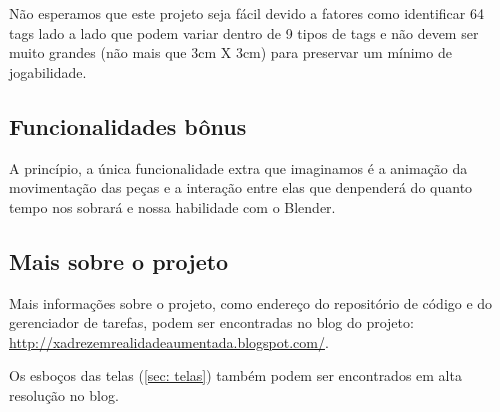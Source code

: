 \documentclass[a4paper,12pt]{article}
\begin{document}
N\~ao esperamos que este projeto seja f\'acil devido a fatores como identificar
64 tags lado a lado que podem variar dentro de 9 tipos de tags e n\~ao devem ser
muito grandes (n\~ao mais que 3cm X 3cm) para preservar um m\'inimo de
jogabilidade.

\subsection{Funcionalidades b\^onus}
\label{subsec: funcionalidaesbinus}

A princ\'ipio, a \'unica funcionalidade extra que imaginamos \'e a anima\c c\~ao
da movimenta\c c\~ao das pe\c cas e a intera\c c\~ao entre elas que denpender\'a
do quanto tempo nos sobrar\'a e nossa habilidade com o Blender.

\subsection{Mais sobre o projeto}
\label{subsec; maissobreoprojeto}

Mais informa\c c\~oes sobre o projeto, como endere\c co do reposit\'orio de
c\'odigo e do gerenciador de tarefas, podem ser encontradas no blog do projeto:
\url{http://xadrezemrealidadeaumentada.blogspot.com/}.

Os esbo\c cos das telas (\ref{sec: telas}) tamb\'em podem ser encontrados em
alta resolu\c c\~ao no blog.
\end{document}
